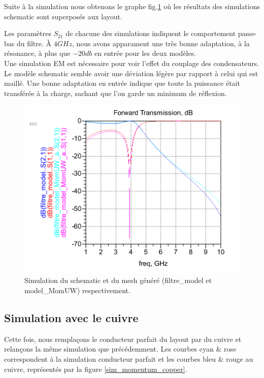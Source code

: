 \documentclass[a4paper]{article}
\begin{document}
Suite \`a la simulation nous obtenons le graphe fig.\ref{sim_schematic_momentum} o\`u les r\'esultats des simulations
schematic sont superpos\'es aux layout.


Les param\`etres $S_{21}$ de chacune des simulations indiquent le comportement passe-bas du filtre. \`A $4 GHz$,
nous avons apparament une tr\`es bonne adaptation, \`a la r\'esonance, \`a plus que $-20 db$ en entr\'ee pour les deux mod\`eles.
\\
Une simulation EM est n\'ecessaire pour voir l'effet du couplage des condensateurs.\\

Le mod\`ele schematic semble avoir une d\'eviation l\'eg\`ere par rapport \`a celui qui est maill\'e.
Une bonne adaptation en entr\'ee indique que toute la puissance \'etait transf\'er\'ee \`a la charge, sachant que l'on garde
un minimum de r\'eflexion.

\clearpage

\begin{figure}[!htb]
\begin{center}
  \includegraphics[scale=0.35]{schematic_mesh.png}
  \caption{Simulation du schematic et du mesh g\'en\'er\'e (filtre\_model et model\_MomUW) respectivement.}
  \label{sim_schematic_momentum}
\end{center}
\end{figure}


\subsection{Simulation avec le cuivre}
Cette fois, nous rempla\c cons le conducteur parfait du layout par du cuivre et relan\c cons la m\^eme simulation que pr\'ec\'edemment.
Les courbes cyan $\&$ rose correspondent \`a la simulation conducteur parfait et les courbes bleu $\&$ rouge au cuivre, repr\'esent\'es
par la figure \ref{sim_momentum_copper}.
\end{document}
